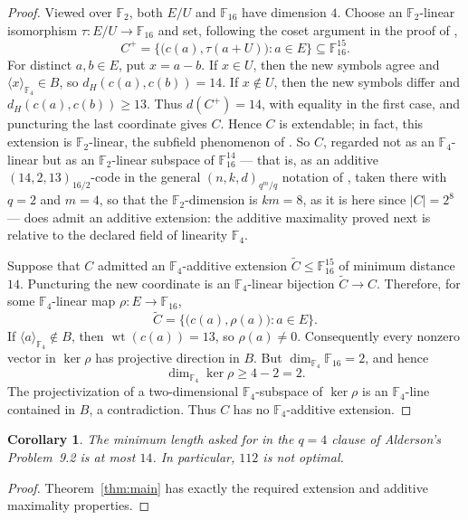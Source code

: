 \documentclass[11pt]{amsart}
\newtheorem{corollary}[theorem]{Corollary}
\theoremstyle{remark}
\newcommand{\F}{\mathbb F}
\newcommand{\wt}{\operatorname{wt}}
\begin{document}
\begin{proof}
Viewed over $\F_2$, both $E/U$ and $\F_{16}$ have dimension $4$. Choose
an $\F_2$-linear isomorphism $\tau:E/U\to\F_{16}$ and set, following the
coset argument in the proof of \cite[Theorem~6.6]{Alderson},
\[
  C^+=\{\bigl(c(a),\tau(a+U)\bigr):a\in E\}
  \subseteq\F_{16}^{15}.
\]
For distinct $a,b\in E$, put $x=a-b$. If $x\in U$, then the new symbols
agree and $\langle x\rangle_{\F_4}\in B$, so
$d_H(c(a),c(b))=14$. If $x\notin U$, then the new symbols differ and
$d_H(c(a),c(b))\ge13$. Thus $d(C^+)=14$, with equality in the first
case, and puncturing the last coordinate gives $C$. Hence $C$ is
extendable; in fact, this extension is $\F_2$-linear, the subfield
phenomenon of \cite[Remark~6.7]{Alderson}. So $C$, regarded not as an
$\F_4$-linear but as an $\F_2$-linear subspace of $\F_{16}^{14}$ --- that is,
as an additive $(14,2,13)_{16/2}$-code in the general
$(n,k,d)_{q^m/q}$ notation of \cite{Alderson}, taken there with $q=2$ and
$m=4$, so that the $\F_2$-dimension is $km=8$, as it is here since
$|C|=2^8$ --- does admit an additive extension: the additive
maximality proved next is relative to the declared field of linearity
$\F_4$.

Suppose that $C$ admitted an $\F_4$-additive extension
$\widetilde C\le\F_{16}^{15}$ of minimum distance $14$. Puncturing the
new coordinate is an $\F_4$-linear bijection $\widetilde C\to C$.
Therefore, for some $\F_4$-linear map $\rho:E\to\F_{16}$,
\[
  \widetilde C=\{\bigl(c(a),\rho(a)\bigr):a\in E\}.
\]
If $\langle a\rangle_{\F_4}\notin B$, then $\wt(c(a))=13$, so
$\rho(a)\ne0$. Consequently every nonzero vector in $\ker\rho$ has
projective direction in $B$. But $\dim_{\F_4}\F_{16}=2$, and hence
\[
  \dim_{\F_4}\ker\rho\ge 4-2=2.
\]
The projectivization of a two-dimensional $\F_4$-subspace of
$\ker\rho$ is an $\F_4$-line contained in $B$, a contradiction. Thus
$C$ has no $\F_4$-additive extension.
\end{proof}

\begin{corollary}
The minimum length asked for in the $q=4$ clause of Alderson's
Problem~9.2 is at most $14$. In particular, $112$ is not optimal.
\end{corollary}

\begin{proof}
Theorem~\ref{thm:main} has exactly the required extension and additive
maximality properties.
\end{proof}
\end{document}
